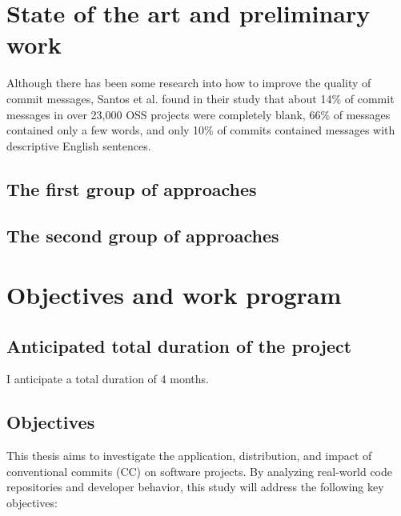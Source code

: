 \documentclass[11pt]{article}
\begin{document}
\section{State of the art and preliminary work}
Although there has been some research into how to improve the quality of commit messages, Santos et al. \cite{Santos2020CommitCU} found in their study that about 14\% of commit messages in over 23,000 OSS projects were completely blank, 66\% of messages contained only a few words, and only 10\% of commits contained messages with descriptive English sentences.

\subsection{The first group of approaches} 
\subsection{The second group of approaches} \label{subsec_SecondGroupRelated}

\section{Objectives and work program}

\subsection{Anticipated total duration of the project}

I anticipate a total duration of 4 months.

\subsection{Objectives}

This thesis aims to investigate the application, distribution, and impact of conventional commits (CC) on software projects. By analyzing real-world code repositories and developer behavior, this study will address the following key objectives:
\end{document}
